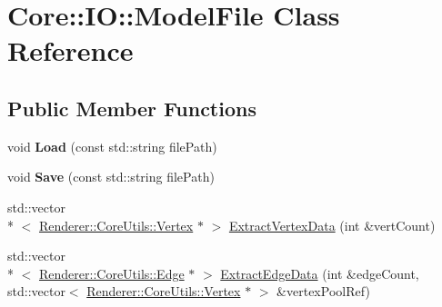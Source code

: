 \hypertarget{class_core_1_1_i_o_1_1_model_file}{\section{Core\+:\+:I\+O\+:\+:Model\+File Class Reference}
\label{class_core_1_1_i_o_1_1_model_file}
}
\subsection*{Public Member Functions}
\begin{DoxyCompactItemize}
\item 
\hypertarget{class_core_1_1_i_o_1_1_model_file_a88dd7beb48bbd56f54ae81ffe06d0e94}{void {\bfseries Load} (const std\+::string file\+Path)}\label{class_core_1_1_i_o_1_1_model_file_a88dd7beb48bbd56f54ae81ffe06d0e94}

\item 
\hypertarget{class_core_1_1_i_o_1_1_model_file_a5d8fb3739b17cdc23b94014e2e7db747}{void {\bfseries Save} (const std\+::string file\+Path)}\label{class_core_1_1_i_o_1_1_model_file_a5d8fb3739b17cdc23b94014e2e7db747}

\item 
std\+::vector\\*
$<$ \hyperlink{class_core_1_1_renderer_1_1_core_utils_1_1_vertex}{Renderer\+::\+Core\+Utils\+::\+Vertex} $\ast$ $>$ \hyperlink{class_core_1_1_i_o_1_1_model_file_a19f09e279bf01f806aa9d4435a845bd3}{Extract\+Vertex\+Data} (int \&vert\+Count)
\item 
std\+::vector\\*
$<$ \hyperlink{class_core_1_1_renderer_1_1_core_utils_1_1_edge}{Renderer\+::\+Core\+Utils\+::\+Edge} $\ast$ $>$ \hyperlink{class_core_1_1_i_o_1_1_model_file_abd7e3094112324e6998a71b4abf4abe7}{Extract\+Edge\+Data} (int \&edge\+Count, std\+::vector$<$ \hyperlink{class_core_1_1_renderer_1_1_core_utils_1_1_vertex}{Renderer\+::\+Core\+Utils\+::\+Vertex} $\ast$ $>$ \&vertex\+Pool\+Ref)
\end{DoxyCompactItemize}


